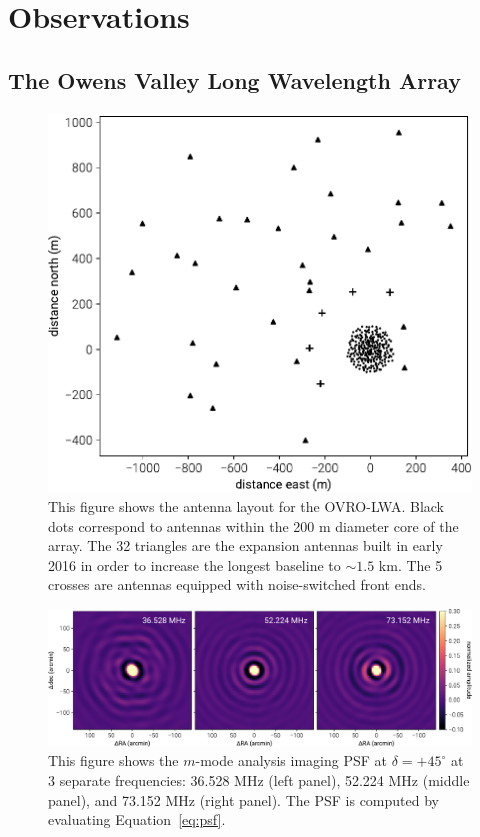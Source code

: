 \documentclass[twocolumn]{aastex61}
\begin{document}
\section{Observations}\label{sec:observations}

\subsection{The Owens Valley Long Wavelength Array}

\begin{figure}[t]
    \includegraphics[width=\columnwidth]{figures/antenna-layout/antenna-layout}
    \caption{
        This figure shows the antenna layout for the OVRO-LWA. Black dots correspond to antennas
        within the 200 m diameter core of the array. The 32 triangles are the expansion antennas
        built in early 2016 in order to increase the longest baseline to $\sim1.5$ km. The 5 crosses
        are antennas equipped with noise-switched front ends.
    }
    \label{fig:antenna-layout}
\end{figure}

\begin{figure}[t]
    \includegraphics[width=\textwidth]{figures/psf/psf}
    \caption{
        This figure shows the $m$-mode analysis imaging PSF at $\delta = +45^\circ$ at 3 separate
        frequencies: 36.528 MHz (left panel), 52.224 MHz (middle panel), and 73.152 MHz (right
        panel). The PSF is computed by evaluating Equation~\ref{eq:psf}.
    }
    \label{fig:psf}
\end{figure}
\end{document}
